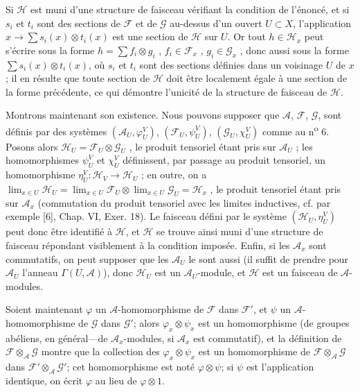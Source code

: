 Si $\mathcal{H}$ est muni d'une structure de faisceau vérifiant la condition de l'énoncé, et si $s_i$ et $t_i$ sont des sections de $\mathcal{F}$ et de $\mathcal{G}$ au-dessus d'un ouvert $U \subset X$, l'application $x \to \sum s_i(x) \otimes t_i(x)$ est une section de $\mathcal{H}$ sur $U$. Or tout $h \in \mathcal{H}_x$ peut s'écrire sous la forme $h = \sum f_i \otimes g_i$ , $f_i \in \mathcal{F}_x$ , $g_i \in \mathcal{G}_x$ , donc aussi sous la forme $\sum s_i(x) \otimes t_i(x)$, où $s_i$ et $t_i$ sont des sections définies dans un voisinage $U$ de $x$; il en résulte que toute section de $\mathcal{H}$ doit être localement égale à une section de la forme précédente, ce qui démontre l'unicité de la structure de faisceau de $\mathcal{H}$.

Montrons maintenant son existence. Nous pouvons supposer que $\mathcal{A}$, $\mathcal{F}$, $\mathcal{G}$, sont définis par des systèmes $(\mathcal{A}_U , \varphi_U^V)$, $(\mathcal{F}_U , \psi_U^V)$, $(\mathcal{G}_U , \chi_U^V)$ comme au n\textsuperscript{o} 6. Posons alors $\mathcal{H}_U = \mathcal{F}_U \otimes \mathcal{G}_U$ , le produit tensoriel étant pris sur $\mathcal{A}_U$ ; les homomorphismes $\psi_U^V$ et $\chi_U^V$ définissent, par passage au produit tensoriel, un homomorphisme $\eta_U^V : \mathcal{H}_V \to \mathcal{H}_U$ ; en outre, on a $\lim_{x \in U} \mathcal{H}_U = \lim_{x \in U} \mathcal{F}_U \otimes \lim_{x \in U} \mathcal{G}_U = \mathcal{H}_x$ , le produit tensoriel étant pris sur $\mathcal{A}_x$ (commutation du produit tensoriel avec les limites inductives, cf. par exemple [6], Chap. VI, Exer. 18). Le faisceau défini par le système $(\mathcal{H}_U , \eta_U^V)$ peut donc être identifié à $\mathcal{H}$, et $\mathcal{H}$ se trouve ainsi muni d'une structure de faisceau répondant visiblement à la condition imposée. Enfin,
si les $\mathcal{A}_x$ sont commutatifs, on peut supposer que les $\mathcal{A}_U$ le sont aussi (il suffit de prendre pour $\mathcal{A}_U$ l'anneau $\Gamma(U, \mathcal{A})$), donc $\mathcal{H}_U$ est un $\mathcal{A}_U$-module, et $\mathcal{H}$ est un faisceau de $\mathcal{A}$-modules.

Soient maintenant $\varphi$ un $\mathcal{A}$-homomorphisme de $\mathcal{F}$ dans $\mathcal{F}'$, et $\psi$ un $\mathcal{A}$-homomorphisme de $\mathcal{G}$ dans $\mathcal{G}'$; alors $\varphi_x \otimes \psi_x$ est un homomorphisme (de groupes abéliens, en général---de $\mathcal{A}_x$-modules, si $\mathcal{A}_x$ est commutatif), et la définition de $\mathcal{F} \otimes_{\mathcal{A}} \mathcal{G}$ montre que la collection des $\varphi_x \otimes \psi_x$ est un homomorphisme de $\mathcal{F} \otimes_{\mathcal{A}} \mathcal{G}$ dans $\mathcal{F}' \otimes_{\mathcal{A}} \mathcal{G}'$; cet homomorphisme est noté $\varphi \otimes \psi$; si $\psi$ est l'application identique, on écrit $\varphi$ au lieu de $\varphi \otimes 1$.

